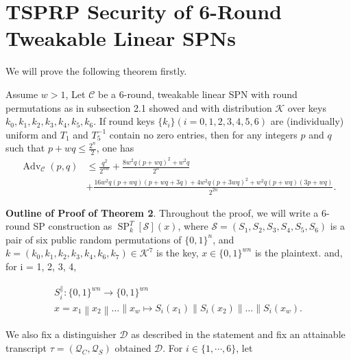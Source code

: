 

\section{TSPRP Security of 6-Round Tweakable Linear SPNs}
\label{section:beyond birthday bound for tweakable linear SPNs}

We will prove the following theorem firstly.

\begin{theorem}
	\label{theorem:6-rounds}
	
	Assume $w>1$, Let $\mathcal{C}$ be a 6-round, tweakable linear SPN with round permutations as in subsection 2.1 showed and with distribution $\mathcal{K}$ over keys $k_{0}, k_{1}, k_{2}, k_{3}, k_{4}, k_{5}, k_{6}$. If round keys $\{k_i\}(i=0, 1, 2, 3, 4, 5, 6)$ are (individually) uniform and $T_1$ and $T_{5}^{-1}$ contain no zero entries, then for any integers $\mathit{p}$ and $\mathit{q}$ such that $p+wq \leq \frac{2^n}{2}$, one has
	\begin{align}
	\operatorname{Adv}_{\mathcal{C}}\left(p, q\right) &\leq \frac{q^2}{2^{n w}} + \frac{8 w^2 q(p+wq)^2+w^2 q}{2^n}\\
	&+ \frac{16 w^2 q(p+w q)(p+w q +3 q)+4 w^2 q(p+3 wq)^2+ w^2q(p+w q)(3p+w q)}{2^{2 n}}.
	\label{eq:bound-6-rounds}
	\end{align}
\end{theorem}



\noindent \textbf{Outline of Proof of Theorem 2}. Throughout the proof, we will write a 6-round SP construction as $\operatorname{SP}^T_{k}[\mathcal{S}](x)$, where $\mathcal{S}=(S_1, S_2, S_3, S_4, S_5, S_6)$  is a pair of six public random permutations of $\{0,1\}^{n}$, and $k = (k_{0}, k_{1}, k_{2}, k_{3}, k_{4}, k_{6}, k_{7}) \in \mathcal{K}^{7}$ is the key, $x \in \{0,1\}^{w n}$ is the plaintext. and, for i = 1, 2, 3, 4,

$$
\begin{array}{c}
{S_{i}^{\|}:\{0,1\}^{w n} \rightarrow\{0,1\}^{w n}} \\
{x=x_{1}\left\|x_{2}\right\| \ldots\left\|x_{w} \longmapsto S_{i}\left(x_{1}\right)\right\| S_{i}\left(x_{2}\right)\|\ldots\| S_{i}\left(x_{w}\right)}.
\end{array}
$$

We also fix a distinguisher $\mathcal{D}$ as described in the statement and fix an attainable transcript $\tau =\left(\mathcal{Q}_{C}, \mathcal{Q}_{S}\right)$ obtained $\mathcal{D}$. For $i \in \{1, \cdots, 6\}$, let

